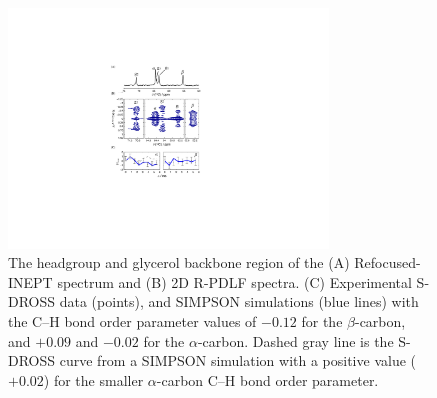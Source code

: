 \documentclass[journal=jpcbfk,manuscript=article]{achemso}
\begin{document}
\begin{figure}[!tb]
  \centering
  \includegraphics[width=8.5cm]{../Figs/fig1_POPS.pdf}
  \caption{\label{PShgSIGNSsimpson}
    The headgroup and glycerol backbone region of the (A) Refocused-INEPT spectrum and
    (B) 2D R-PDLF spectra.
    (C) Experimental S-DROSS data (points), and SIMPSON simulations (blue lines) with
    the C--H bond order parameter values of $-0.12$ for the $\beta$-carbon, and $+0.09$ and $-0.02$
    for the $\alpha$-carbon.
    Dashed gray line is the S-DROSS curve from a SIMPSON simulation with a positive value ($+0.02$) 
    for the smaller $\alpha$-carbon C--H bond order parameter.
  }
\end{figure}
\end{document}
